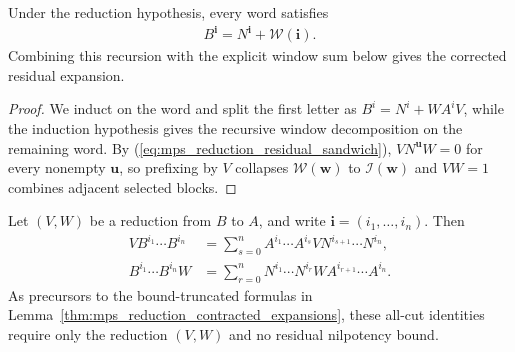 \begin{lemma}
    \label{thm:mps_reduction_recursive_residual_expansion}
    \leanok
    Under the reduction hypothesis, every word satisfies
    \begin{align}
        B^{\mathbf i}=N^{\mathbf i}+\mathcal W(\mathbf i).
        \label{eq:mps_reduction_recursive_residual_expansion}
    \end{align}
    Combining this recursion with the explicit window sum below gives the
    corrected residual expansion.
\end{lemma}

\begin{proof}
    \leanok
    We induct on the word and split the first letter as $B^i=N^i+WA^iV$, while
    the induction hypothesis gives the recursive window decomposition on the
    remaining word.  By (\ref{eq:mps_reduction_residual_sandwich}),
    $VN^{\mathbf u}W=0$ for every nonempty $\mathbf u$, so prefixing by $V$
    collapses $\mathcal W(\mathbf w)$ to $\mathcal I(\mathbf w)$ and $VW=1$
    combines adjacent selected blocks.
\end{proof}

\begin{lemma}
    \label{thm:mps_reduction_all_cut_contracted}
    \leanok
    Let $(V,W)$ be a reduction from $B$ to $A$, and write
    $\mathbf i=(i_1,\ldots,i_n)$.  Then
    \begin{align}
        VB^{i_1}\cdots B^{i_n}
         & =\sum_{s=0}^{n}
        A^{i_1}\cdots A^{i_s}V
        N^{i_{s+1}}\cdots N^{i_n},
        \label{eq:mps_reduction_left_all_cut} \\
        B^{i_1}\cdots B^{i_n}W
         & =\sum_{r=0}^{n}
        N^{i_1}\cdots N^{i_r}W
        A^{i_{r+1}}\cdots A^{i_n}.
        \label{eq:mps_reduction_right_all_cut}
    \end{align}
    As precursors to the bound-truncated formulas in
    Lemma~\ref{thm:mps_reduction_contracted_expansions}, these all-cut
    identities require only the reduction $(V,W)$ and no residual nilpotency
    bound.
\end{lemma}

